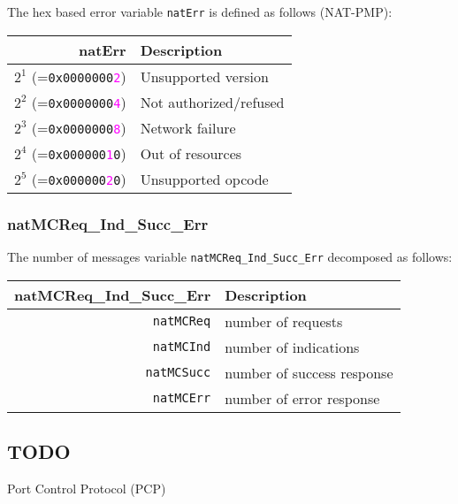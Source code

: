 \documentclass[documentation]{subfiles}
\begin{document}
The hex based error variable {\tt natErr} is defined as follows (NAT-PMP):
\begin{longtable}{rl}
    \toprule
    {\bf natErr} & {\bf Description} \\
    \midrule\endhead%
    $2^{1}$ (={\tt 0x0000000\textcolor{magenta}{2}}) & Unsupported version\\
    $2^{2}$ (={\tt 0x0000000\textcolor{magenta}{4}}) & Not authorized/refused\\
    $2^{3}$ (={\tt 0x0000000\textcolor{magenta}{8}}) & Network failure\\
    $2^{4}$ (={\tt 0x000000\textcolor{magenta}{1}0}) & Out of resources\\
    $2^{5}$ (={\tt 0x000000\textcolor{magenta}{2}0}) & Unsupported opcode\\
    \bottomrule
\end{longtable}

\subsubsection{natMCReq\_Ind\_Succ\_Err}\label{natMCReqIndSuccErr}
The number of messages variable {\tt natMCReq\_Ind\_Succ\_Err} decomposed as follows:
\begin{longtable}{rl}
    \toprule
    {\bf natMCReq\_Ind\_Succ\_Err} & {\bf Description} \\
    \midrule\endhead%
    {\tt natMCReq}  & number of requests\\
    {\tt natMCInd}  & number of indications\\
    {\tt natMCSucc} & number of success response\\
    {\tt natMCErr}  & number of error response\\
    \bottomrule
\end{longtable}


\subsection{TODO}
Port Control Protocol (PCP)
\end{document}
